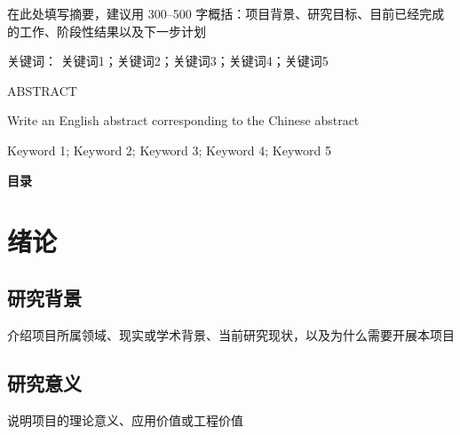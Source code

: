 \documentclass[UTF8,a4paper,zihao=-4]{ctexart}
\numberwithin{equation}{section}
\numberwithin{figure}{section}
\numberwithin{table}{section}
\begin{document}
\songti{}
在此处填写摘要，建议用 300--500 字概括：项目背景、研究目标、目前已经完成的工作、阶段性结果以及下一步计划

\vspace{0.5cm}
\noindent\heiti{}关键词：\songti{}
关键词1；关键词2；关键词3；关键词4；关键词5

\newpage


\begin{center}
{ ABSTRACT}
\end{center}

\selectfont{}
Write an English abstract corresponding to the Chinese abstract

\vspace{0.5cm}
Keyword 1; Keyword 2; Keyword 3; Keyword 4; Keyword 5

\newpage

\clearpage
\begin{center}
    \heiti{}\textbf{目\hspace{1em}录}
\end{center}
\vspace{2em}
\makeatletter
{}
\makeatother
\newpage

\cleardoublepage
{}
\setcounter{page}{1}

\section{绪论}

\subsection{研究背景}
\songti{}
介绍项目所属领域、现实或学术背景、当前研究现状，以及为什么需要开展本项目

\subsection{研究意义}
\songti{}
说明项目的理论意义、应用价值或工程价值
\end{document}
